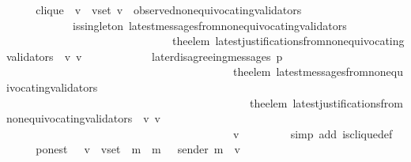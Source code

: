 \begin{isabellebody}
\ \ \isamarkupfalse%
\ \isamarkupfalse%
\ clique{\isacharcolon}\ {\isachardoublequoteopen}{\isasymforall}\ v\ {\isasymin}\ v{\isacharunderscore}set{\isachardot}\ v\ {\isasymin}\ observed{\isacharunderscore}non{\isacharunderscore}equivocating{\isacharunderscore}validators\ {\isasymsigma}\ \ \isanewline
\ \ \ \ \ \ \ \ \ \ \ {\isasymand}\ is{\isacharunderscore}singleton\ {\isacharparenleft}latest{\isacharunderscore}messages{\isacharunderscore}from{\isacharunderscore}non{\isacharunderscore}equivocating{\isacharunderscore}validators\ \isanewline
\ \ \ \ \ \ \ \ \ \ \ \ \ \ \ \ \ \ \ \ \ \ \ \ \ \ \ \ \ \ {\isacharparenleft}the{\isacharunderscore}elem\ {\isacharparenleft}latest{\isacharunderscore}justifications{\isacharunderscore}from{\isacharunderscore}non{\isacharunderscore}equivocating{\isacharunderscore}validators\ {\isasymsigma}\ v{\isacharparenright}{\isacharparenright}\ v{\isacharparenright}\isanewline
\ \ \ \ \ \ \ \ \ \ \ {\isasymand}\ later{\isacharunderscore}disagreeing{\isacharunderscore}messages\ {\isacharparenleft}p{\isacharcomma}\isanewline
\ \ \ \ \ \ \ \ \ \ \ \ \ \ \ \ \ \ \ \ \ \ \ \ \ \ \ \ \ \ \ \ \ \ \ \ \ \ \ \ \ the{\isacharunderscore}elem\ {\isacharparenleft}latest{\isacharunderscore}messages{\isacharunderscore}from{\isacharunderscore}non{\isacharunderscore}equivocating{\isacharunderscore}validators\ \isanewline
\ \ \ \ \ \ \ \ \ \ \ \ \ \ \ \ \ \ \ \ \ \ \ \ \ \ \ \ \ \ \ \ \ \ \ \ \ \ \ \ \ \ \ \ {\isacharparenleft}the{\isacharunderscore}elem\ {\isacharparenleft}latest{\isacharunderscore}justifications{\isacharunderscore}from{\isacharunderscore}non{\isacharunderscore}equivocating{\isacharunderscore}validators\ {\isasymsigma}\ v{\isacharparenright}{\isacharparenright}\ v{\isacharparenright}\isanewline
\ \ \ \ \ \ \ \ \ \ \ \ \ \ \ \ \ \ \ \ \ \ \ \ \ \ \ \ \ \ \ \ \ \ \ \ \ \ \ \ {\isacharcomma}\ v{\isacharcomma}\ {\isasymsigma}{\isacharparenright}\ {\isacharequal}\ {\isasymemptyset}{\isachardoublequoteclose}\isanewline
\ \ \ \ \isamarkupfalse%
\ {\isacharparenleft}simp\ add{\isacharcolon}\ is{\isacharunderscore}clique{\isacharunderscore}def{\isacharparenright}\isanewline
\ \ \isamarkupfalse%
\ \isamarkupfalse%
\ p{\isacharunderscore}on{\isacharunderscore}est\ {\isacharcolon}\ {\isachardoublequoteopen}{\isasymforall}\ v\ {\isasymin}\ v{\isacharunderscore}set{\isachardot}\ {\isacharparenleft}{\isasymforall}\ m\ {\isasymin}\ {\isacharbraceleft}m{\isacharprime}\ {\isasymin}\ {\isasymsigma}{\isachardot}\ sender\ m{\isacharprime}\ {\isacharequal}\ v\ \isanewline

\end{isabellebody}
